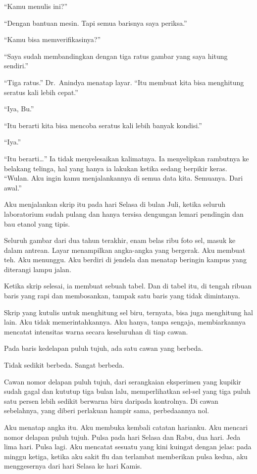 \documentclass[11pt,twoside,openany]{book}
\makeatletter
\newcommand{\scenebreak}{\par\vspace{0.9em}{\centering\textsc{*\hspace{0.7em}*\hspace{0.7em}*}\par}\vspace{0.9em}\@afterindentfalse\@afterheading}
\makeatother
\begin{document}
``Kamu menulis ini?''

``Dengan bantuan mesin. Tapi semua barisnya saya periksa.''

``Kamu bisa memverifikasinya?''

``Saya sudah membandingkan dengan tiga ratus gambar yang saya hitung sendiri.''

``Tiga ratus.'' Dr.~Anindya menatap layar. ``Itu membuat kita bisa menghitung seratus kali lebih cepat.''

``Iya, Bu.''

``Itu berarti kita bisa mencoba seratus kali lebih banyak kondisi.''

``Iya.''

``Itu berarti\ldots{}'' Ia tidak menyelesaikan kalimatnya. Ia menyelipkan rambutnya ke belakang telinga, hal yang hanya ia lakukan ketika sedang berpikir keras. ``Wulan. Aku ingin kamu menjalankannya di semua data kita. Semuanya. Dari awal.''

\scenebreak
Aku menjalankan skrip itu pada hari Selasa di bulan Juli, ketika seluruh laboratorium sudah pulang dan hanya tersisa dengungan lemari pendingin dan bau etanol yang tipis.

Seluruh gambar dari dua tahun terakhir, enam belas ribu foto sel, masuk ke dalam antrean. Layar menampilkan angka-angka yang bergerak. Aku membuat teh. Aku menunggu. Aku berdiri di jendela dan menatap beringin kampus yang diterangi lampu jalan.

Ketika skrip selesai, ia membuat sebuah tabel. Dan di tabel itu, di tengah ribuan baris yang rapi dan membosankan, tampak satu baris yang tidak dimintanya.

Skrip yang kutulis untuk menghitung sel biru, ternyata, bisa juga menghitung hal lain. Aku tidak memerintahkannya. Aku hanya, tanpa sengaja, membiarkannya mencatat intensitas warna secara keseluruhan di tiap cawan.

Pada baris kedelapan puluh tujuh, ada satu cawan yang berbeda.

Tidak sedikit berbeda. Sangat berbeda.

Cawan nomor delapan puluh tujuh, dari serangkaian eksperimen yang kupikir sudah gagal dan kututup tiga bulan lalu, memperlihatkan sel-sel yang tiga puluh satu persen lebih sedikit berwarna biru daripada kontrolnya. Di cawan sebelahnya, yang diberi perlakuan hampir sama, perbedaannya nol.

Aku menatap angka itu. Aku membuka kembali catatan harianku. Aku mencari nomor delapan puluh tujuh. Pulsa pada hari Selasa dan Rabu, dua hari. Jeda lima hari. Pulsa lagi. Aku mencatat sesuatu yang kini kuingat dengan jelas: pada minggu ketiga, ketika aku sakit flu dan terlambat memberikan pulsa kedua, aku menggesernya dari hari Selasa ke hari Kamis.
\end{document}
